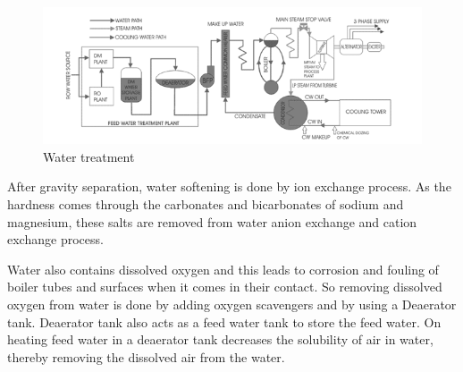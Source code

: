 \documentclass{report}
\begin{document}
\begin{figure}[H]
\centering \includegraphics[width=\textwidth]{images/tpp2.png}
\caption{Water treatment}
\end{figure}

\par After gravity separation, water softening is done by ion exchange process. As the hardness comes through the carbonates and bicarbonates of sodium and magnesium, these salts are removed from water anion exchange and cation exchange process. \par Water also contains dissolved oxygen and this leads to corrosion and fouling of boiler tubes and surfaces when it comes in their contact. So removing dissolved oxygen from water is done by adding oxygen scavengers and by using a Deaerator tank. Deaerator tank also acts as a feed water tank to store the feed water. On heating feed water in a deaerator tank decreases the solubility of air in water, thereby removing the dissolved air from the water.
\end{document}

